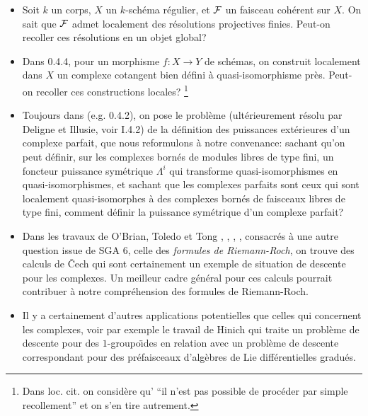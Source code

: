 \documentclass[12pt]{article}
\newcommand{\Ff}{{\cal F}}
\begin{document}
\begin{itemize}
\item
Soit $k$ un corps, $X$ un $k$-sch\'ema r\'egulier, et $\Ff$ un faisceau
coh\'erent
sur $X$. On sait que $\Ff$ admet localement des r\'esolutions projectives
finies. Peut-on recoller ces r\'esolutions en un objet global?
\item
Dans \cite {SGA6} 0.4.4, pour un morphisme $f:X \rightarrow Y$ de sch\'emas,
on construit localement dans $X$ un complexe cotangent bien d\'efini \`a
quasi-isomorphisme pr\`es. Peut-on recoller ces constructions locales?
\footnote { Dans loc. cit. on consid\`ere qu'
``il n'est pas possible de proc\'eder par simple recollement'' et on
s'en tire autrement.}

\item

Toujours dans \cite {SGA6} (e.g. 0.4.2), on pose le probl\`eme
(ult\'erieurement r\'esolu par Deligne et Illusie, voir \cite {Illusie} I.4.2)
de la d\'efinition des puissances ext\'erieures d'un complexe parfait,
que nous reformulons \`a notre convenance: sachant
qu'on peut d\'efinir, sur les complexes born\'es de
modules  libres de type fini, un foncteur puissance sym\'etrique $\Lambda^i$ qui
transforme quasi-isomorphismes en quasi-isomorphismes, et sachant
que les complexes parfaits sont ceux qui sont localement quasi-isomorphes
\`a des complexes born\'es de faisceaux libres de type fini, comment
d\'efinir la puissance sym\'etrique d'un complexe parfait?

\item

Dans les travaux de O'Brian, Toledo et Tong
\cite{ObrianToledoTong1}, \cite{ObrianToledoTong2},
\cite{Toledo1}, \cite{Toledo2}, \cite{Toledo3}
consacr\'es \`a une autre question issue de SGA 6,
celle des {\em formules de Riemann-Roch}, on trouve des calculs de \v{C}ech
qui  sont certainement un exemple de situation de descente pour les
complexes. Un meilleur cadre g\'en\'eral pour ces calculs
pourrait
contribuer \`a notre compr\'ehension des formules de Riemann-Roch.

\item


Il y a certainement d'autres applications potentielles que celles
qui concernent les complexes, voir par exemple
le travail de Hinich \cite{Hinich1} qui traite un probl\`eme de descente
pour des $1$-groupo\"{\i}des en relation avec un probl\`eme de descente
correspondant pour des pr\'efaisceaux d'alg\`ebres de Lie
diff\'erentielles gradu\'es.



\end{itemize}
\end{document}

